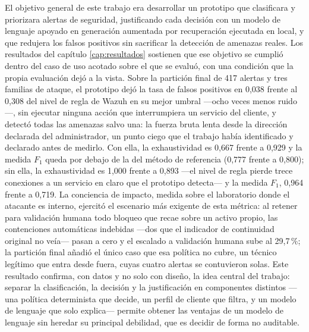 %


El objetivo general de este trabajo era desarrollar un prototipo que clasificara y priorizara
alertas de seguridad, justificando cada decisión con un modelo de lenguaje apoyado en generación
aumentada por recuperación ejecutada en local, y que redujera los falsos positivos sin sacrificar
la detección de amenazas reales. Los resultados del capítulo \ref{cap:resultados} sostienen que ese
objetivo se cumplió dentro del caso de uso acotado sobre el que se evaluó, con una condición que la
propia evaluación dejó a la vista. Sobre la partición final de 417 alertas y tres familias de
ataque, el prototipo dejó la tasa de falsos positivos en 0,038 frente al 0,308 del nivel de regla
de Wazuh en su mejor umbral ---ocho veces menos ruido---, sin ejecutar ninguna acción que
interrumpiera un servicio del cliente, y detectó todas las amenazas salvo una: la fuerza bruta lenta
desde la dirección declarada del administrador, un punto ciego que el trabajo había identificado y
declarado antes de medirlo. Con ella, la exhaustividad es 0,667 frente a 0,929 y la medida $F_1$
queda por debajo de la del método de referencia (0,777 frente a 0,800); sin ella, la exhaustividad
es 1,000 frente a 0,893 ---el nivel de regla pierde trece conexiones a un servicio en claro que el
prototipo detecta--- y la medida $F_1$, 0,964 frente a 0,719. La conciencia de impacto, medida sobre el laboratorio donde
el atacante es interno, ejercitó el escenario más exigente de esta métrica: al retener para validación humana todo bloqueo que recae sobre un activo propio, las
contenciones automáticas indebidas ---dos que el indicador de continuidad original no veía--- pasan a
cero y el escalado a validación humana sube al 29,7\,\%; la partición final añadió el único caso
que esa política no cubre, un técnico legítimo que entra desde fuera, cuyas cuatro alertas se
contuvieron solas. Este resultado confirma, con datos y no solo
con diseño, la
idea central del trabajo: separar la clasificación, la decisión y la justificación en componentes
distintos ---una política determinista que decide, un perfil de cliente que filtra, y un modelo de
lenguaje que solo explica--- permite obtener las ventajas de un modelo de lenguaje sin heredar su
principal debilidad, que es decidir de forma no auditable.

